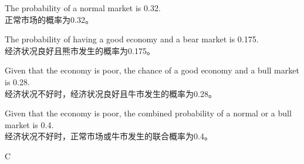 \documentclass{article}
\begin{document}
    \begin{choices}
        \item The probability of a normal market is 0.32.\\
        正常市场的概率为0.32。
        \item The probability of having a good economy and a bear market is 0.175.\\
        经济状况良好且熊市发生的概率为0.175。
        \item Given that the economy is poor, the chance of a good economy and a bull market is 0.28.\\
        经济状况不好时，经济状况良好且牛市发生的概率为0.28。
        \item Given that the economy is poor, the combined probability of a normal or a bull market is 0.4.\\
        经济状况不好时，正常市场或牛市发生的联合概率为0.4。
    \end{choices}
    
    \begin{correctanswer}
        C
    \end{correctanswer}
    
\end{document}
